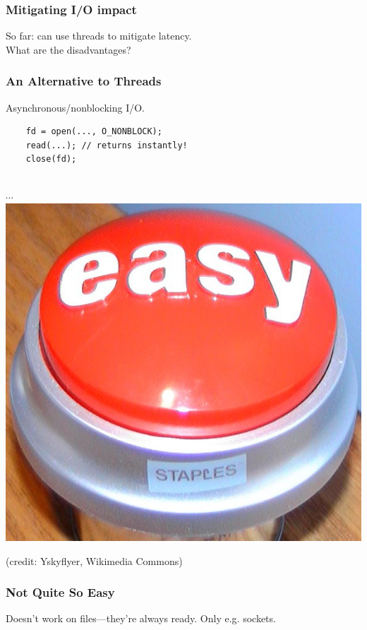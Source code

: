 \begin{frame}[fragile]
  \frametitle{Mitigating I/O impact}

    So far: can use threads to mitigate latency.\\

    What are the disadvantages?

\end{frame}


\begin{frame}[fragile]
  \frametitle{An Alternative to Threads}

    Asynchronous/nonblocking I/O.\\[2em]


\begin{minipage}{.6\textwidth}
\begin{lstlisting}
    fd = open(..., O_NONBLOCK);
    read(...); // returns instantly!
    close(fd);
  \end{lstlisting}
\end{minipage}


\begin{center}
~\\[1em]
$\cdots$\\[2em]

\includegraphics[width=.25\textwidth]{images/Easy_button.JPG}
\end{center}
\hfill {\scriptsize (credit: Yskyflyer, Wikimedia Commons)}


\end{frame}

\begin{frame}
  \frametitle{Not Quite So Easy}

    Doesn't work on files---they're always ready. Only e.g. sockets.

\end{frame}

